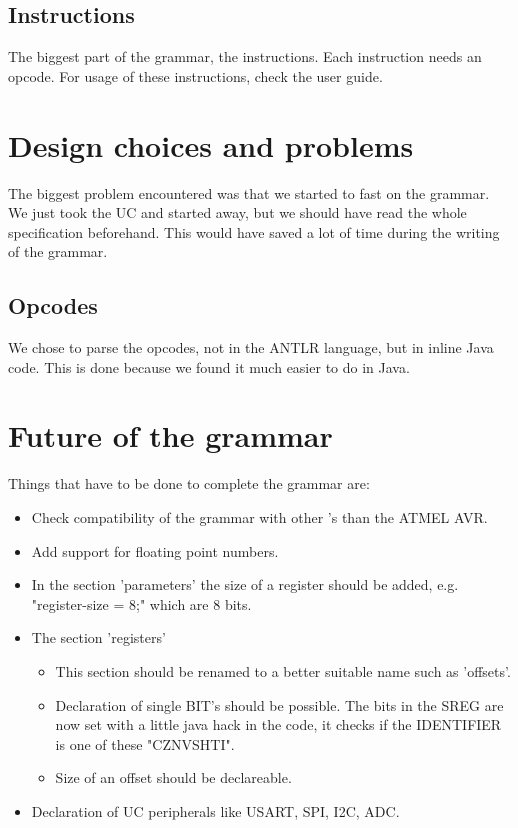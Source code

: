 \subsection{Instructions}
The biggest part of the grammar, the instructions. Each instruction needs an opcode. For usage of these instructions, check the user guide.

\section{Design choices and problems}
The biggest problem encountered was that we started to fast on the grammar. We just took the \ac{UC} and started away, but we should have read the whole specification beforehand. This would have saved a lot of time during the writing of the grammar.

\subsection{Opcodes}
We chose to parse the opcodes, not in the ANTLR language, but in inline Java code. This is done because we found it much easier to do in Java.

\section{Future of the grammar}
Things that have to be done to complete the grammar are:
\begin{itemize}
\item Check compatibility of the grammar with other {\UC}'s than the ATMEL AVR.
\item Add support for floating point numbers.
\item In the section 'parameters' the size of a register should be added, e.g. "register-size = 8;" which are 8 bits.
\item The section 'registers'
\begin{itemize}
\item This section should be renamed to a better suitable name such as 'offsets'.
\item Declaration of single BIT's should be possible. The bits in the \ac{SREG} are now set with a little java hack in the code, it checks if the IDENTIFIER is one of these "CZNVSHTI".  
\item Size of an offset should be declareable.
\end{itemize}
\item Declaration of \ac{UC} peripherals like USART, SPI, I2C, ADC.
\end{itemize}
